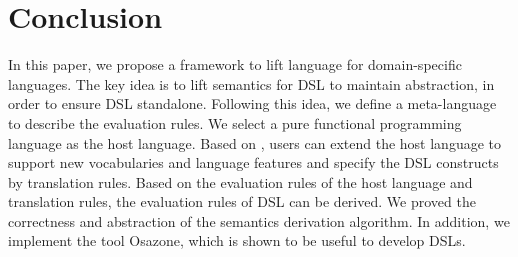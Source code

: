 \section{Conclusion}

In this paper, we propose a framework to lift language for domain-specific languages.
The key idea is to lift semantics for DSL to maintain abstraction,
 in order to ensure DSL standalone.
Following this idea, we define a meta-language to describe the evaluation rules.
We select a pure functional programming language \STLC{} as the host language.
Based on \STLC, users can extend the host language to support new vocabularies and language features
 and specify the DSL constructs by translation rules.
Based on the evaluation rules of the host language and translation rules, the evaluation rules of DSL can be derived.
We proved the correctness and abstraction of the semantics derivation algorithm.
In addition, we implement the tool Osazone, which is shown to be useful to develop DSLs.

